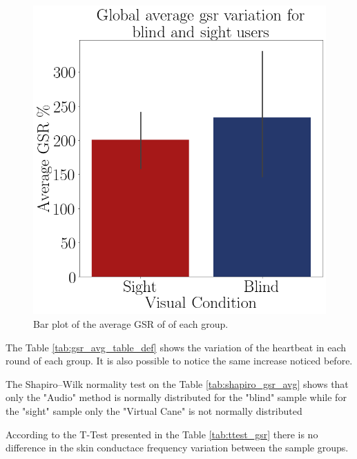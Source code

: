 \begin{figure}[!htb]
\begin{minipage}{.45\linewidth}
        \includegraphics[width = \linewidth]{Resultados/GSR/Figuras/png/barplot_gsr_avg.png}
        \caption{Bar plot of the average GSR of of each group.}
        \label{fig:barplot_gsr_avg}
    \end{minipage}
\end{figure}

The Table \ref{tab:gsr_avg_table_def} shows the variation of the heartbeat in each round of each group. It is also possible to notice the same increase noticed before.



The Shapiro–Wilk normality test on the Table \ref{tab:shapiro_gsr_avg} shows that only the "Audio" method is normally distributed for the "blind" sample while for the "sight" sample only the "Virtual Cane" is not normally distributed

According to the T-Test presented in the Table \ref{tab:ttest_gsr} there is no difference in the skin conductace  frequency variation between the sample groups.


\begin{table}[!htb]
    \begin{minipage}{.45\linewidth}
        
    \end{minipage}
    \hfill
    \begin{minipage}{.45\linewidth}
        \vspace{-2.75cm}
        
    \end{minipage}
\end{table}


